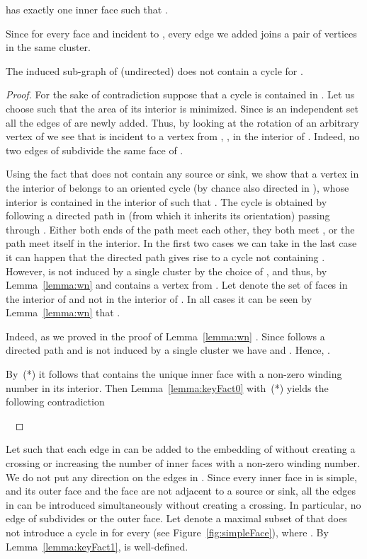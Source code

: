 \documentclass{llncs}
\def\qed{ \ \vrule width.2cm height.2cm depth0cm\smallskip}
\begin{document}
\begin{lemma}
\label{lemma:keyFact0}
 has exactly one inner face  such that .
\end{lemma}

Since  for every face  and  incident to , 
every edge we added joins a pair of vertices in the same cluster.


    \begin{lemma}
\label{lemma:keyFact1}
The induced sub-graph  of (undirected)  does not contain a cycle for .
\end{lemma}
\begin{proof}
For the sake of contradiction suppose that a cycle  is contained in .
Let us choose  such that the area of its interior is minimized.
Since  is an independent set all the edges of  are newly added.
Thus, by looking at the rotation of an arbitrary vertex  of  we see that  is incident to a vertex 
  from  , ,  in the interior of . Indeed, no two edges of  subdivide the same face of .
 
 



 
Using the fact that  does not contain any source or sink, we show that 
a vertex  in the interior of  belongs to an oriented cycle  (by chance also directed in ), whose interior is contained in the interior of    
such that .
The cycle  is obtained by following a directed path in  (from which it inherits its orientation)
 passing through  .
Either both ends of the path meet each other, they both meet , or the path meet itself in the interior. 
In the first two cases we can take  in the last case it can happen that the directed path gives rise to a cycle  not containing . However,  is not induced by a single cluster by the choice of , and thus,  by Lemma~\ref{lemma:wn} and  contains a vertex  from .
Let  denote the set of faces
in the interior of  and not in the interior of . 
In all cases it can be seen   by Lemma~\ref{lemma:wn} that .

Indeed, as we proved in  the proof of Lemma~\ref{lemma:wn} 
.
Since  follows a directed path and is not induced by a single cluster we have  and .
Hence, . 



 By~(*) it follows that  contains the unique
inner face with a non-zero winding number in its interior.
Then Lemma~\ref{lemma:keyFact0} with~(*) yields the following  contradiction

\qed\end{proof}

Let  such that each edge in  can be added to 
the embedding of  without creating a crossing or increasing the number of inner faces with a non-zero winding number.
We do not put any direction on the edges in .
Since every inner face  in  is simple, and its outer face and the face  are not adjacent
to a source or sink, all the edges in  can be 
introduced simultaneously without creating a crossing. 
In particular, no edge of  subdivides  or the outer face.
Let  denote a maximal subset of 
that does not introduce a cycle in  for every  (see Figure~\ref{fig:simpleFace}), where .
By Lemma~\ref{lemma:keyFact1},  is well-defined.
\end{document}
